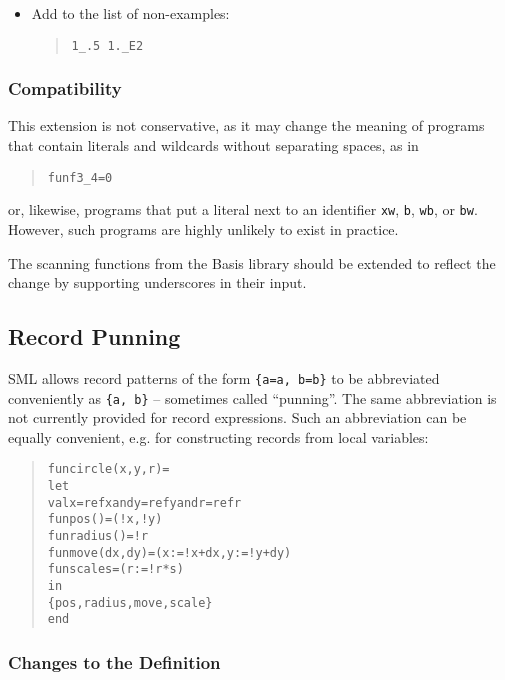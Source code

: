 \documentclass[twoside,titlepage]{article}
\begin{document}
\begin{appendix}
\begin{itemize}
\item Add to the list of non-examples:
  \begin{quote}
  {\tt 1\_.5  1.\_E2}
  \end{quote}
\end{itemize}

\subsubsection*{Compatibility}

This extension is not conservative, as it may change the meaning of programs that contain literals and wildcards without separating spaces, as in
\begin{quote}
\begin{alltt}
fun f 3_4 = 0
\end{alltt}
\end{quote}
or, likewise, programs that put a literal next to an identifier {\tt xw}, {\tt b}, {\tt wb}, or {\tt bw}. However, such programs are highly unlikely to exist in practice. 

The scanning functions from the Basis library should be extended to reflect the change by supporting underscores in their input.


\subsection{Record Punning}
\label{ext-recordpunning}

SML allows record patterns of the form {\tt \{a=a, b=b\}} to be abbreviated conveniently as {\tt \{a, b\}} -- sometimes called ``punning''. The same abbreviation is not currently provided for record expressions. Such an abbreviation can be equally convenient, e.g. for constructing records from local variables:
\begin{quote}
\begin{alltt}
fun circle(x,y,r) =
    let
        val x = ref x and y = ref y and r = ref r
        fun pos() = (!x,!y)
        fun radius() = !r
        fun move(dx,dy) = (x := !x+dx, y := !y+dy)
        fun scale s = (r := !r*s)
    in
        \{pos, radius, move, scale\}
    end
\end{alltt}
\end{quote}

\subsubsection*{Changes to the Definition}


\end{appendix}
\end{document}
